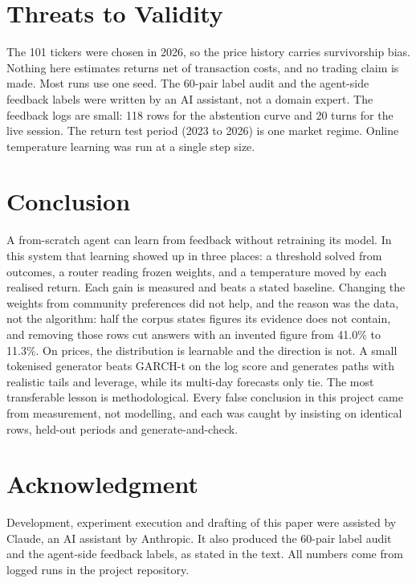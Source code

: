 \documentclass[conference]{IEEEtran}
\begin{document}
\section{Threats to Validity}
The 101 tickers were chosen in 2026, so the price history carries survivorship bias. Nothing here
estimates returns net of transaction costs, and no trading claim is made. Most runs use one seed. The
60-pair label audit and the agent-side feedback labels were written by an AI assistant, not a domain
expert. The feedback logs are small: 118 rows for the abstention curve and 20 turns for the live
session. The return test period (2023 to 2026) is one market regime. Online temperature learning was
run at a single step size.

\section{Conclusion}
A from-scratch agent can learn from feedback without retraining its model. In this system that
learning showed up in three places: a threshold solved from outcomes, a router reading frozen
weights, and a temperature moved by each realised return. Each gain is measured and beats a stated
baseline. Changing the weights from community preferences did not help, and the reason was the data,
not the algorithm: half the corpus states figures its evidence does not contain, and removing
those rows cut answers with an invented figure from 41.0\% to 11.3\%. On prices, the
distribution is learnable and the direction is not. A small tokenised generator beats GARCH-t on the
log score and generates paths with realistic tails and leverage, while its multi-day forecasts only
tie. The most transferable lesson is methodological. Every false conclusion in this project came from
measurement, not modelling, and each was caught by insisting on identical rows, held-out periods and
generate-and-check.

\section*{Acknowledgment}
Development, experiment execution and drafting of this paper were assisted by Claude, an AI assistant
by Anthropic. It also produced the 60-pair label audit and the agent-side feedback labels, as stated
in the text. All numbers come from logged runs in the project repository.



\end{document}
